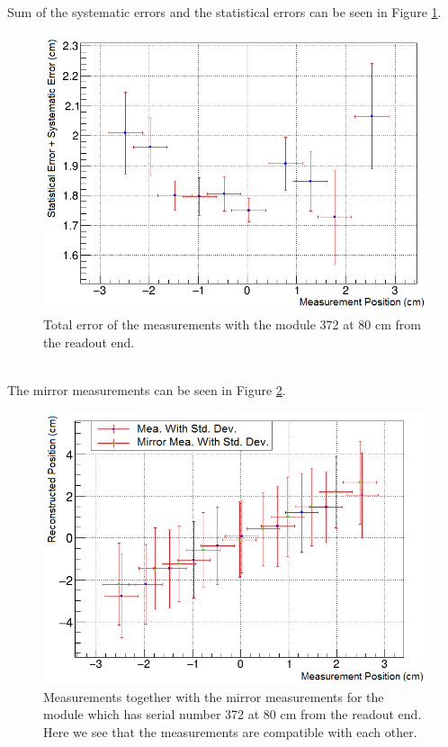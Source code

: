\documentclass[a4paper]{article}\linespread{1.4}
\begin{document}
Sum of the systematic errors and the statistical errors can be seen in Figure \ref{fig:72e}.
\begin{figure}[h!] \hspace*{-0cm} \includegraphics[width=120mm,scale=2.0]{72e.png} \caption{Total error of the measurements with the module 372 at 80 cm from the readout end.}  \label{fig:72e}\end{figure}
\\The mirror measurements can be seen in Figure \ref{fig:72mir}.
\begin{figure}[h!] \hspace*{-0cm} \includegraphics[width=120mm,scale=2.0]{72mir.png} \caption{Measurements together with the mirror measurements for the module which has serial number 372 at 80 cm from the readout end. Here we see that the measurements are compatible with each other.}  \label{fig:72mir}\end{figure}
\end{document}
